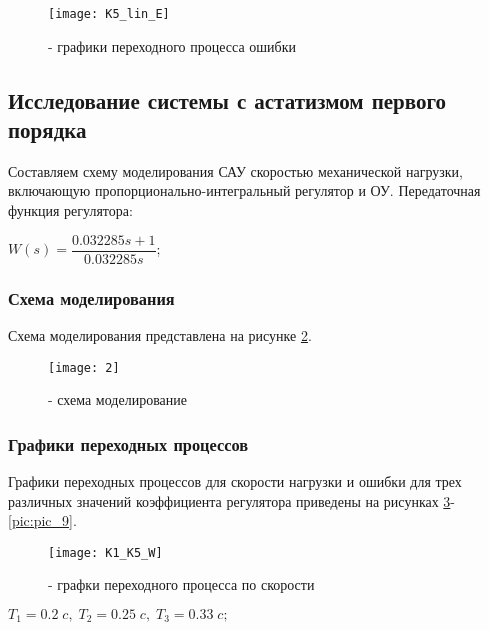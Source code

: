 \begin{figure}[H]
	\begin{center}
		\texttt{[image: K5\_lin\_E]}
		\caption{- графики переходного процесса ошибки} 
		\label{pic:pic_6} %
	\end{center}
\end{figure}

\subsection{Исследование системы с астатизмом первого порядка}
Составляем схему моделирования САУ скоростью механической нагрузки, включающую пропорционально-интегральный регулятор и ОУ. Передаточная функция регулятора:
\begin{center}
	$W(s) = \dfrac{0.032285s+1}{0.032285s}$;
\end{center}

\subsubsection{Схема моделирования}
Схема моделирования представлена на рисунке \ref{pic:pic_7}.
\begin{figure}[H]
	\begin{center}
		\texttt{[image: 2]}
		\caption{- схема моделирование} 
		\label{pic:pic_7} %
	\end{center}
\end{figure}

\subsubsection{Графики переходных процессов}
Графики переходных процессов для скорости нагрузки и ошибки для трех различных значений коэффициента регулятора приведены на рисунках \ref{pic:pic_8}-\ref{pic:pic_9}.
\begin{figure}[H]
	\begin{center}
		\texttt{[image: K1\_K5\_W]}
		\caption{- графки переходного процесса по скорости} 
		\label{pic:pic_8} %
	\end{center}
\end{figure}

\begin{center}
$T_1 = 0.2\;c,\; T_2= 0.25\;c,\; T_3 =0.33\;c ;$
\end{center}


